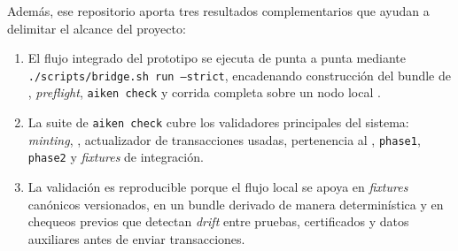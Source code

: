 Además, ese repositorio aporta tres resultados complementarios que ayudan a delimitar el alcance del proyecto:

\begin{enumerate}[noitemsep]
  \item El flujo integrado del prototipo se ejecuta de punta a punta mediante \texttt{./scripts/bridge.sh run --strict}, encadenando construcción del bundle de \Mithril, \textit{preflight}, \texttt{aiken check} y corrida completa sobre un nodo local \Dolos.
  \item La suite de \texttt{aiken check} cubre los validadores principales del sistema: \textit{minting}, \StakeDistribution, actualizador de transacciones usadas, pertenencia al \Snapshot, \texttt{phase1}, \texttt{phase2} y \textit{fixtures} de integración.
  \item La validación es reproducible porque el flujo local se apoya en \textit{fixtures} canónicos versionados, en un bundle derivado de manera determinística y en chequeos previos que detectan \textit{drift} entre pruebas, certificados y datos auxiliares antes de enviar transacciones.
\end{enumerate}
